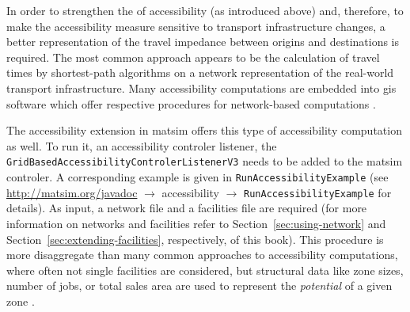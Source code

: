 In order to strengthen the  of accessibility (as introduced above) and, therefore, to 
make the accessibility measure sensitive to transport infrastructure changes, a better representation of the travel 
impedance between origins and destinations is required. The most common approach appears to be the calculation of 
travel times by shortest-path algorithms on a network representation of the real-world transport infrastructure.
Many accessibility computations are embedded into \gls{gis} software which offer respective procedures for network-based 
computations 
\citep{BBSR20xxErreichbarkeitsmodell, CurtisEtAl2013AccessibilityPolicyInnovation, BuettnerEtAl2010Erreichbarkeitsatlas}.

%

The accessibility extension in \gls{matsim} offers this type of accessibility computation as well. To run it, an 
accessibility controler listener, \eg the \lstinline{GridBasedAccessibilityControlerListenerV3} needs to be added to 
the \gls{matsim} controler. A corresponding example is given in \lstinline{RunAccessibilityExample} (see
\url{http://matsim.org/javadoc} $\to$ accessibility $\to$ \lstinline{RunAccessibilityExample} for details). As input, a 
network file and a facilities file are required
(for more information on networks and facilities refer to 
Section~\ref{sec:using-network} and Section~\ref{sec:extending-facilities}, respectively, of this book).
This procedure is more disaggregate than many common approaches to accessibility computations, where often not single 
facilities are considered, but structural data like zone sizes, number of jobs, or total sales area are used to 
represent the \emph{potential} of a given zone 
\citep{BuettnerEtAl2010Erreichbarkeitsatlas, GulhanEtAl2014PotentialAccessibilityMeasureDenizli}.



